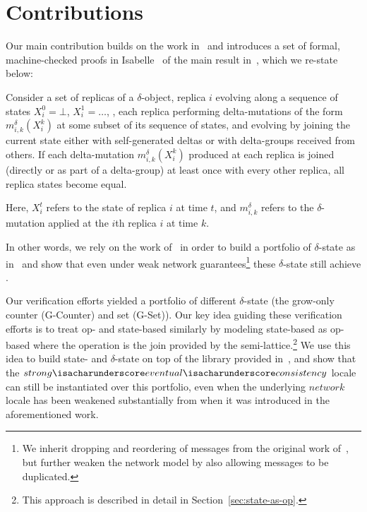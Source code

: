 \section{Contributions}

Our main contribution builds on the work in~\citet{gomes17} and introduces a set
of formal, machine-checked proofs in Isabelle~\citep{wenzel02} of the main
result in~\citet{almedia18}, which we re-state below:

\begin{theorem}
  Consider a set of replicas of a $\delta$-\CRDT object, replica $i$ evolving
  along a sequence of states $X_i^0 = \bot$, $X_i^1=\ldots$, , each replica
  performing delta-mutations of the form $m^\delta_{i,k}(X^k_i)$ at some subset
  of its sequence of states, and evolving by joining the current state either
  with self-generated deltas or with delta-groups received from others. If each
  delta-mutation $m^\delta _{i,k}(X^k_i)$ produced at each replica is joined
  (directly or as part of a delta-group) at least once with every other replica,
  all replica states become equal.
\end{theorem}

Here, $X_i^t$ refers to the state of replica $i$ at time $t$, and
$m^\delta_{i,k}$ refers to the $\delta$-mutation applied at the $i$th replica
$i$ at time $k$.

In other words, we rely on the work of~\citet{gomes17} in order to build a
portfolio of $\delta$-state \CRDTs as in~\citet{almedia18} and show that even
under weak network guarantees\footnote{We inherit dropping and reordering of
messages from the original work of~\citet{gomes17}, but further weaken the
network model by also allowing messages to be duplicated.} these $\delta$-state
\CRDTs still achieve \SEC.

Our verification efforts yielded a portfolio of different $\delta$-state \CRDTs
(the grow-only counter (G-Counter) and set (G-Set)). Our key idea guiding these
verification efforts is to treat op- and state-based \CRDTs similarly by
modeling state-based \CRDTs as op-based where the operation is the join provided
by the semi-lattice.\footnote{This approach is described in detail in
Section~\ref{sec:state-as-op}.} We use this idea to build state- and
$\delta$-state \CRDTs on top of the library provided in~\citet{gomes17}, and
show that the
$strong{\isacharunderscore}eventual{\isacharunderscore}consistency$ locale can
still be instantiated over this portfolio, even when the underlying $network$
locale has been weakened substantially from when it was introduced in the
aforementioned work.

